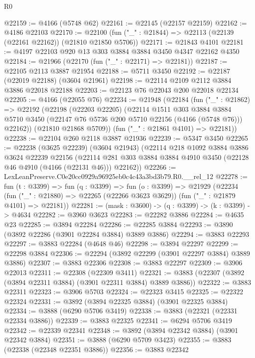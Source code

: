 \begin{lexlean}{R0}
\begin{coremodule}
@22159 := @4166 (@5748 @62)
@22161 := @22145 (@22157 @22159)
@22162 := @4186 @22103
@22170 := @22100 (fun ("_" : @21844) => @22113 (@22139 (@22161 @22162)) (@21810 @21850 @5706))
@22171 := @21843 @4101
@22181 := @4197 @22103 @920 @13 @303 @3884 @3884 @3450 @4347 @22162 @4350
@22184 := @21966 (@22170 (fun ("_" : @22171) => @22181))
@22187 := @22105 @2113 @3887 @21954
@22188 := @5711 @3450
@22192 := @22187 (@22019 @22188) (@3604 @21961)
@22198 := @22114 @2109 @2112 @3884 @3886 @22018 @22188
@22203 := @22123 @76 @22043 @200 @22018 @22134
@22205 := @4166 (@22055 @76)
@22234 := @21948
    (@22184
      (fun ("_" : @21862) =>
      @22192
        (@22198
          (@22203 @22205)
          (@22114
            @1511
            @303
            @3884
            @3884
            @5710
            @3450
            (@22147 @76 @5736 @200 @5710 @22156 (@4166 (@5748 @76)))
            @22162))
        (@21810 @21868 @5709))
      (fun ("_" : @21861 @4101) => @22181))
@22238 := @22104 @260 @2118 @3887 @21936
@22239 := @5347 @3450
@22265 := @22238
    (@3625 @22239)
    (@3604 @21943)
    (@22114
      @218
      @1092
      @3884
      @3886
      @3624
      @22239
      @22156
      (@22114 @281 @303 @3884 @3884 @4910 @3450 (@22128 @46 @4910 (@4166 (@22131 @46))) @22162))
@22266 := LexLeanPreserve.C0e20cc0929a96925eb0c4c43a3bd3b79.R0.__rel_12
@22278 := fun (t : @3399) =>
  fun (q : @3399) =>
  fun (o : @3399) =>
  @21929
    (@22234
      (fun ("_" : @21880) => @22265 (@22266 @3623 @3629))
      (fun ("_" : @21879 @4101) => @22181))
@22281 := (mask : @3600) -> (q : @3399) -> (k : @3399) -> @4634
@22282 := @3960 @3623
@22283 := @22282 @3886
@22284 := @4635 @23
@22285 := @3894 @22284
@22286 := @22285 @3884
@22293 := @3890 (@3892 @22286 (@3901 @22284 @3884) @3889 @3886)
@22294 := @3883 @22293
@22297 := @3883 @22284 (@4648 @46)
@22298 := @3894 @22297
@22299 := @22298 @3884
@22306 := @22294 (@3892 @22299 (@3901 @22297 @3884) @3889 @3886)
@22307 := @3883 @22306
@22308 := @3883 @22297
@22309 := @3906 @22013
@22311 := @22308 (@22309 @3411)
@22321 := @3883 (@22307 (@3892 (@3894 @22311 @3884) (@3901 @22311 @3884) @3889 @3886))
@22322 := @3883 @22311
@22323 := @3906 @5703
@22324 := @22323 @3415
@22325 := @22322 @22324
@22331 := @3892 (@3894 @22325 @3884) (@3901 @22325 @3884)
@22334 := @3888 (@6290 @5706 @3419)
@22338 := @3883 (@22321 (@22331 @22334 @3886))
@22339 := @3883 @22325
@22341 := @6294 @5706 @3419
@22342 := @22339 @22341
@22348 := @3892 (@3894 @22342 @3884) (@3901 @22342 @3884)
@22351 := @3888 (@6290 @5709 @3423)
@22355 := @3883 (@22338 (@22348 @22351 @3886))
@22356 := @3883 @22342

\end{coremodule}
\end{lexlean}
